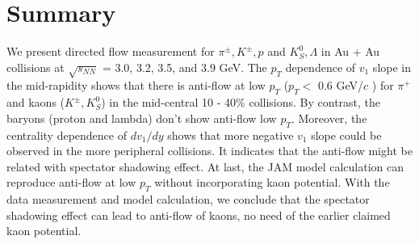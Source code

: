 \section{Summary}

We present directed flow measurement for $\pi^{\pm}, K^{\pm}, p$ and $K^0_S, \Lambda$
in Au + Au collisions at $\sqrt{s_{NN}}$ = 3.0, 3.2, 3.5, and 3.9 GeV.
The $p_T$ dependence of $v_1$ slope in the mid-rapidity shows
that there is anti-flow at low $p_T$ ($p_T <$ 0.6 GeV/$c$ ) for $\pi^{+}$ and kaons ($K^{\pm}, K^0_S$) in the mid-central 10 - 40\% collisions.
By contrast, the baryons (proton and lambda) don't show anti-flow low $p_T$.
Moreover, the centrality dependence of $dv_1/dy$ shows
that more negative $v_1$ slope could be observed in the more peripheral collisions.
It indicates that the anti-flow might be related with spectator shadowing effect.
At last, the JAM model calculation can reproduce anti-flow at low $p_T$ without incorporating kaon potential.
With the data measurement and model calculation,
we conclude that the spectator shadowing effect can lead to anti-flow of kaons, no need of the earlier claimed kaon potential.
